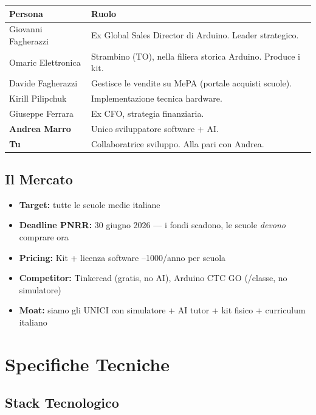 \documentclass[11pt,a4paper]{article}
\begin{document}
\begin{tabularx}{\textwidth}{lX}
\toprule
\textbf{Persona} & \textbf{Ruolo} \\
\midrule
Giovanni Fagherazzi & Ex Global Sales Director di Arduino. Leader strategico. \\
Omaric Elettronica & Strambino (TO), nella filiera storica Arduino. Produce i kit. \\
Davide Fagherazzi & Gestisce le vendite su MePA (portale acquisti scuole). \\
Kirill Pilipchuk & Implementazione tecnica hardware. \\
Giuseppe Ferrara & Ex CFO, strategia finanziaria. \\
\textbf{Andrea Marro} & Unico sviluppatore software + AI. \\
\textbf{Tu} & Collaboratrice sviluppo. Alla pari con Andrea. \\
\bottomrule
\end{tabularx}

\subsection{Il Mercato}

\begin{itemize}[leftmargin=2em]
  \item \textbf{Target:} tutte le scuole medie italiane
  \item \textbf{Deadline PNRR:} 30 giugno 2026 --- i fondi scadono, le scuole \textit{devono} comprare ora
  \item \textbf{Pricing:} Kit  + licenza software --1000/anno per scuola
  \item \textbf{Competitor:} Tinkercad (gratis, no AI), Arduino CTC GO (/classe, no simulatore)
  \item \textbf{Moat:} siamo gli UNICI con simulatore + AI tutor + kit fisico + curriculum italiano
\end{itemize}

\section{Specifiche Tecniche}

\subsection{Stack Tecnologico}
\end{document}
